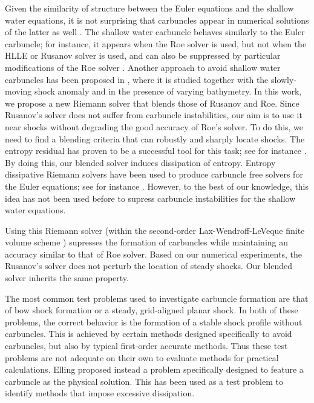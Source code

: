 \documentclass[preprint, 11pt]{article}
\begin{document}
Given the similarity of structure between the Euler equations and the shallow
water equations, it is not surprising that carbuncles appear in numerical
solutions of the latter as well \cite{kemm2014note}.
The shallow water carbuncle behaves similarly to the
Euler carbuncle; for instance, it appears when the Roe solver is used, but not when
the HLLE or Rusanov solver is used, and can also be suppressed by particular modifications
of the Roe solver \cite{kemm2014note,bader2014carbuncle}.  Another approach to avoid
shallow water carbuncles has been proposed in \cite{navas2019improved}, where it is
studied together with the slowly-moving shock anomaly and in the presence of varying bathymetry.
In this work, we propose a new Riemann solver that blends those of Rusanov and Roe.
Since Rusanov's solver does not suffer from carbuncle instabilities,
our aim is to use it near shocks without degrading the good accuracy of Roe's solver. 
To do this, we need to find a blending criteria that can robustly and sharply locate shocks.
The entropy residual has proven to be a successful tool for this task; see for instance
\cite{guermond2011entropy,guermond2018second,guermond2018well}.
By doing this, our blended solver induces dissipation of entropy.
Entropy dissipative Riemann solvers have been used to produce carbuncle free solvers for the Euler equations;
{\color{OliveGreen} see for instance \cite{ismail2009affordable,ismail2009proposed, chizari2021cell}.}
However, to the best of our knowledge, this idea has not been used before to supress carbuncle instabilities for the shallow water equations. 

Using this Riemann solver (within the second-order Lax-Wendroff-LeVeque 
finite volume scheme \cite{leveque1997wave, leveque2002finite}) supresses the formation of carbuncles 
while maintaining an accuracy similar to that of Roe solver.  
Based on our numerical experiments, 
{\color{red} the Rusanov's solver does not perturb the location of steady shocks.} 
Our blended solver inherits the same property.

The most common test problems used to investigate carbuncle formation are
that of bow shock formation or a steady, grid-aligned planar shock.
In both of these problems, the correct behavior is the formation of a stable
shock profile without carbuncles.  This is achieved by certain methods
designed specifically to avoid carbuncles, but also by typical first-order
accurate methods.  Thus these test problems are not adequate on their own to
evaluate methods for practical calculations.
Elling \cite{elling2009carbuncle} proposed instead a problem specifically
designed to feature a carbuncle as the physical solution.  This has
been used as a test problem to identify methods that impose excessive dissipation.
\end{document}
